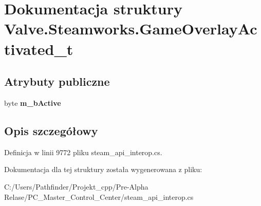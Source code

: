 \hypertarget{struct_valve_1_1_steamworks_1_1_game_overlay_activated__t}{}\section{Dokumentacja struktury Valve.\+Steamworks.\+Game\+Overlay\+Activated\+\_\+t}
\label{struct_valve_1_1_steamworks_1_1_game_overlay_activated__t}
\subsection*{Atrybuty publiczne}
\begin{DoxyCompactItemize}
\item 
\mbox{\label{struct_valve_1_1_steamworks_1_1_game_overlay_activated__t_a3195e6cec112fbd5b2a5cbd63cbab635}} 
byte {\bfseries m\+\_\+b\+Active}
\end{DoxyCompactItemize}


\subsection{Opis szczegółowy}


Definicja w linii 9772 pliku steam\+\_\+api\+\_\+interop.\+cs.



Dokumentacja dla tej struktury została wygenerowana z pliku\+:\begin{DoxyCompactItemize}
\item 
C\+:/\+Users/\+Pathfinder/\+Projekt\+\_\+cpp/\+Pre-\/\+Alpha Relase/\+P\+C\+\_\+\+Master\+\_\+\+Control\+\_\+\+Center/steam\+\_\+api\+\_\+interop.\+cs\end{DoxyCompactItemize}
